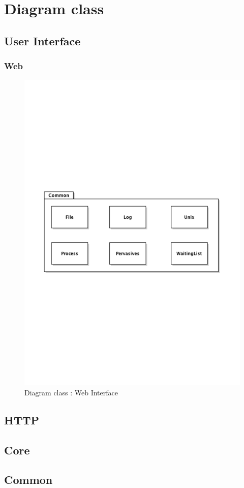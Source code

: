 \newpage
\chapter{Diagram class}

\section{User Interface}
		\subsection{Web}
		\begin{figure}[ht]
			\begin{center}
				\includegraphics[width=\textwidth,  trim=2cm 6cm 2cm 7cm]{UML_figure/DC/common/DC_Common.pdf}
				\caption{Diagram class : Web Interface}
			\end{center}
		\end{figure}
	
\section{HTTP}

\section{Core}

\section{Common}